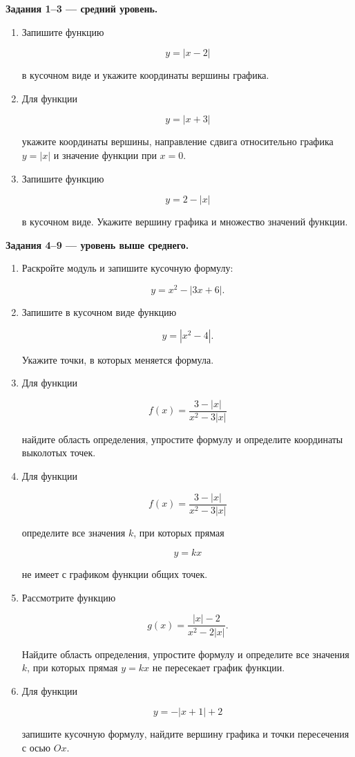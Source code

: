 \documentclass[a4paper,12pt]{article}
\begin{document}
\textcolor{darkaccent}{\textbf{Задания 1--3 --- средний уровень.}}

\begin{enumerate}

\item
Запишите функцию

\[
y=|x-2|
\]

в кусочном виде и укажите координаты вершины графика.

\item
Для функции

\[
y=|x+3|
\]

укажите координаты вершины, направление сдвига относительно графика \(y=|x|\)
и значение функции при \(x=0\).

\item
Запишите функцию

\[
y=2-|x|
\]

в кусочном виде. Укажите вершину графика и множество значений функции.

\end{enumerate}

\vspace{0.5em}
\textcolor{darkaccent}{\textbf{Задания 4--9 --- уровень выше среднего.}}

\begin{enumerate}[resume]

\item
Раскройте модуль и запишите кусочную формулу:

\[
y=x^2-|3x+6|.
\]

\item
Запишите в кусочном виде функцию

\[
y=|x^2-4|.
\]

Укажите точки, в которых меняется формула.

\item
Для функции

\[
f(x)=
\frac{3-|x|}
{x^2-3|x|}
\]

найдите область определения, упростите формулу и определите координаты выколотых точек.

\item
Для функции

\[
f(x)=
\frac{3-|x|}
{x^2-3|x|}
\]

определите все значения \(k\), при которых прямая

\[
y=kx
\]

не имеет с графиком функции общих точек.

\item
Рассмотрите функцию

\[
g(x)=
\frac{|x|-2}
{x^2-2|x|}.
\]

Найдите область определения, упростите формулу и определите все значения \(k\),
при которых прямая \(y=kx\) не пересекает график функции.

\item
Для функции

\[
y=-|x+1|+2
\]

запишите кусочную формулу, найдите вершину графика и точки пересечения с осью \(Ox\).

\end{enumerate}
\end{document}
